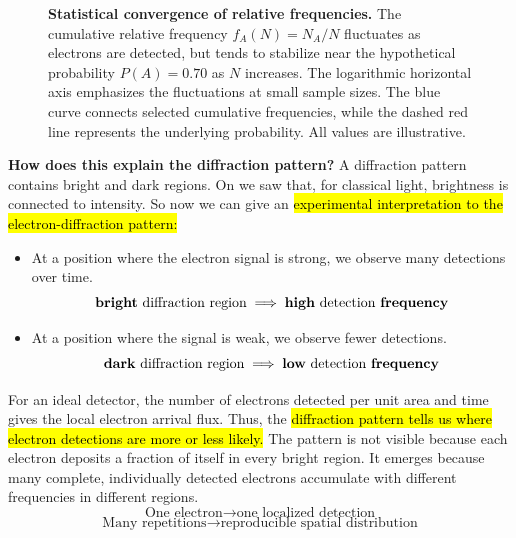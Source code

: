\begin{figure}[!htbp]

    \caption{
        \textbf{Statistical convergence of relative frequencies.}
        The cumulative relative frequency
        $f_A(N)=N_A/N$ fluctuates as electrons
        are detected, but tends to stabilize
        near the hypothetical probability
        $P(A)=0.70$ as $N$ increases.
        The logarithmic horizontal axis
        emphasizes the fluctuations at small
        sample sizes. The blue curve connects
        selected cumulative frequencies,
        while the dashed red line represents
        the underlying probability.
        All values are illustrative.
    }
    \label{fig:relative-frequency-statistical-convergence}
\end{figure}

\highspace
\textcolor{Green3}{ \textbf{How does this explain the diffraction pattern?}} A diffraction pattern contains bright and dark regions. On  we saw that, for classical light, brightness is connected to intensity. So now we can give an \hl{experimental interpretation to the electron-diffraction pattern:}
\begin{itemize}
    \item At a position where the electron signal is strong, we observe many detections over time.
        \begin{equation*}
            \text{\textbf{bright} diffraction region} \implies \text{\textbf{high} detection \textbf{frequency}}
        \end{equation*}
    \item At a position where the signal is weak, we observe fewer detections.
        \begin{equation*}
            \text{\textbf{dark} diffraction region} \implies \text{\textbf{low} detection \textbf{frequency}}
        \end{equation*}
\end{itemize}
For an ideal detector, the number of electrons detected per unit area and time gives the local electron arrival flux.
Thus, the \hl{diffraction pattern tells us where electron detections are more or less likely.}
The pattern is not visible because each electron deposits a fraction of itself in every bright region.
It emerges because many complete, individually detected electrons accumulate with different frequencies in different regions.
\begin{equation*}
    \text{One electron} \rightarrow \text{one localized detection}
\end{equation*}
\begin{equation*}
    \text{Many repetitions} \rightarrow \text{reproducible spatial distribution}
\end{equation*}

